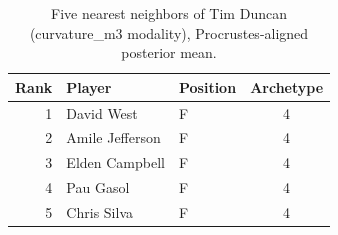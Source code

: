 \begin{table}[htbp]
  \centering\small
  \begin{tabular}{rllc}
    \toprule
    Rank & Player & Position & Archetype \\
    \midrule
    1 & David West & F & 4 \\
    2 & Amile Jefferson & F & 4 \\
    3 & Elden Campbell & F & 4 \\
    4 & Pau Gasol & F & 4 \\
    5 & Chris Silva & F & 4 \\
    \bottomrule
  \end{tabular}
  \caption{Five nearest neighbors of Tim Duncan (curvature_m3 modality), Procrustes-aligned posterior mean.}
  \label{tab:Tim_Duncan_neighbors_curvature_m3}
\end{table}

